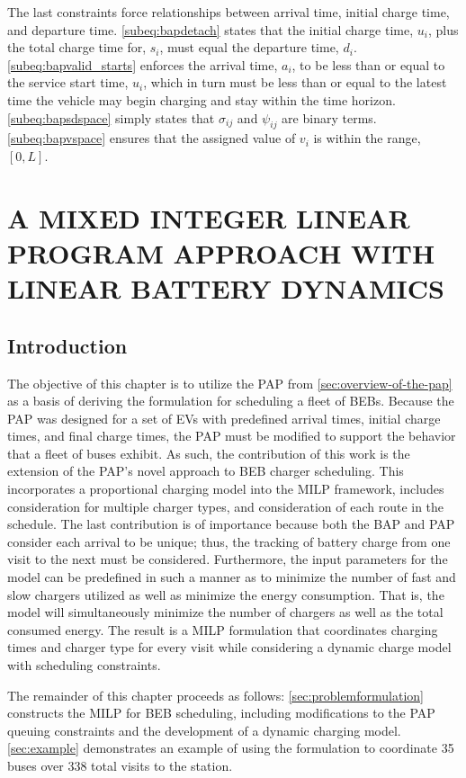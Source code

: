\documentclass[ee,thesis]{usuthesis}
\newcommand{\A}{35 }                                                            %
\newcommand{\N}{338 }                                                           %
\begin{document}
The last constraints force relationships between arrival time, initial charge time, and departure time.
\autoref{subeq:bapdetach} states that the initial charge time, \(u_i\), plus the total charge time for, \(s_i\), must equal
the departure time, \(d_i\). \autoref{subeq:bapvalid_starts} enforces the arrival time, \(a_i\), to be less than or equal to
the service start time, \(u_i\), which in turn must be less than or equal to the latest time the vehicle may begin
charging and stay within the time horizon. \autoref{subeq:bapsdspace} simply states that \(\sigma_{ij}\) and \(\psi_{ij}\) are
binary terms. \autoref{subeq:bapvspace} ensures that the assigned value of \(v_i\) is within the range, \([0,L]\).
\chapter{A MIXED INTEGER LINEAR PROGRAM APPROACH WITH LINEAR BATTERY DYNAMICS}
\label{sec:milp-pap}
\section{Introduction}
\label{sec:milp-introduction}
The objective of this chapter is to utilize the PAP from \ref{sec:overview-of-the-pap} as a basis of deriving the formulation
for scheduling a fleet of BEBs. Because the PAP was designed for a set of EVs with predefined arrival times, initial
charge times, and final charge times, the PAP must be modified to support the behavior that a fleet of buses exhibit. As
such, the contribution of this work is the extension of the PAP's novel approach to BEB charger scheduling. This
incorporates a proportional charging model into the MILP framework, includes consideration for multiple charger types,
and consideration of each route in the schedule. The last contribution is of importance because both the BAP and PAP
consider each arrival to be unique; thus, the tracking of battery charge from one visit to the next must be considered.
Furthermore, the input parameters for the model can be predefined in such a manner as to minimize the number of fast and
slow chargers utilized as well as minimize the energy consumption. That is, the model will simultaneously minimize the
number of chargers as well as the total consumed energy. The result is a MILP formulation that coordinates charging
times and charger type for every visit while considering a dynamic charge model with scheduling constraints.

The remainder of this chapter proceeds as follows: \autoref{sec:problemformulation} constructs the MILP for BEB
scheduling, including modifications to the PAP queuing constraints and the development of a dynamic charging model.
\autoref{sec:example} demonstrates an example of using the formulation to coordinate \A buses over \N total visits
to the station.
\end{document}
